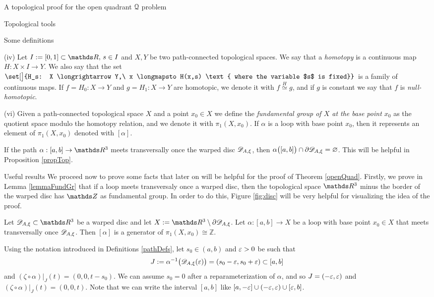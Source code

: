 \documentclass[11pt, a4paper, english, twoside, notitlepage, openright]{report}
\begin{document}
\begin{chapter}{A topological proof for the open quadrant $\mathcal{Q}$ problem}
\begin{section}{Topological tools}
\begin{subsection}{Some definitions}
\begin{definitions}
(iv) Let $I:=[0,1]\subset\R,\, s\in I$ and $X, Y$ be two path-connected topological spaces. We say that a \emph{homotopy} is a continuous map $H: X\times I\longrightarrow Y$. We also say that the set $\set[\big]{H_s: X \longrightarrow Y,\ x \longmapsto H(x,s) \text{ where the variable $s$ is fixed}}$ is a family of continuous maps. If $f=H_0:X\longrightarrow Y$ and $g=H_1:X\longrightarrow Y$ are homotopic, we denote it with $f \overset{H}{\simeq}g$, and if $g$ is constant we say that $f$ is \emph{null-homotopic}.

(vi) Given a path-connected topological space $X$ and a point $x_0\in X$ we define the \emph{fundamental group of $X$ at the base point $x_0$} as the quotient space modulo the homotopy relation, and we denote it with $\pi_1(X,x_0)$. If $\alpha$ is a loop with base point $x_0$, then it represents an element of $\pi_1(X,x_0)$ denoted with $[\alpha]$.
\end{definitions}

\begin{remark}\label{remPath}
If the path $\alpha:[a,b]\to\R^3$ meets transversally once the warped disc $\mathscr{D}_{A,\xi}$, then $\alpha\big([a,b]\big)\cap\partial\mathscr{D}_{A,\xi}=\varnothing$. This will be helpful in Proposition \ref{propTop}.
\end{remark}
\end{subsection}

\begin{subsection}{Useful results}
We proceed now to prove some facts that later on will be helpful for the proof of Theorem \ref{openQuad}. Firstly, we prove in Lemma \ref{lemmaFundGr} that if a loop meets transversaly once a warped disc, then the topological space $\R^3$ minus the border of the warped disc has $\Z$ as fundamental group. In order to do this, Figure \ref{fig:disc} will be very helpful for visualizing the idea of the proof.

\begin{lemma}\label{lemmaFundGr}
Let $\D_{A,\xi}\subset\R^3$ be a warped disc and let $X:=\R^3\setminus\partial\D_{A,\xi}$. Let $\alpha:[a,b]\to X$ be a loop with base point $x_0\in X$ that meets transversally once $\mathscr{D}_{A,\xi}$. Then $[\alpha]$ is a generator of $\pi_1(X,x_0)\cong{\mathbb Z}$.
\begin{Proof} 
Using the notation introduced in Definitions \ref{pathDefs}, let $s_0\in(a,b)$ and $\varepsilon>0$ be such that 
$$
J:=\alpha^{-1}\big(\mathscr{D}_{A,\xi}(\varepsilon)\big)=(s_0-\varepsilon,s_0+\varepsilon)\subset[a,b]
$$ 
and $(\zeta\circ\alpha)|_J(t)=(0,0,t-s_0)$. We can assume $s_0=0$ after a reparameterization of $\alpha$, and so $J = (-\varepsilon,\varepsilon)$ and $(\zeta\circ\alpha)|_J(t)=(0,0,t)$. Note that we can write the interval $[a,b]$ like $[a,-\varepsilon]\cup(-\varepsilon,\varepsilon)\cup[\varepsilon,b]$.


\end{Proof}
\end{lemma}
\end{subsection}
\end{section}
\end{chapter}
\end{document}

